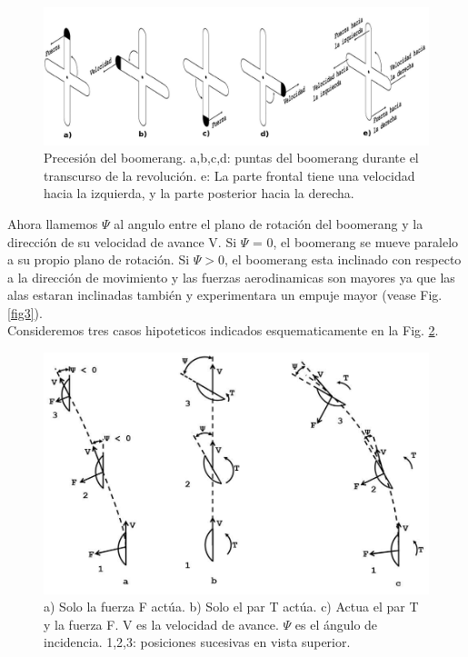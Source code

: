 		\begin{figure}[ht]
		\begin{center}
		\includegraphics[scale=0.15]{imagenes/3-boomerang/PrecesionDelBoomerang.png}
		\caption{Precesión del boomerang. a,b,c,d: puntas del boomerang durante el transcurso de la revolución. e: La parte frontal tiene una velocidad hacia la izquierda, y la parte posterior hacia la derecha.}
		\label{fig8}
		\end{center}
		\end{figure}

	Ahora llamemos $\Psi$ al angulo entre el plano de rotación del boomerang y la dirección de su velocidad de avance V. Si $\Psi$ = 0, el boomerang se mueve paralelo a su propio plano de rotación. Si $\Psi>0$, el boomerang esta inclinado con respecto a la dirección de movimiento y las fuerzas aerodinamicas son mayores ya que las alas estaran inclinadas también y experimentara un empuje mayor (vease Fig. \ref{fig3}).\\

	Consideremos tres casos hipoteticos indicados esquematicamente en la Fig. \ref{fig9}.

		\begin{figure}[ht]
		\begin{center}
		\includegraphics[scale=0.3]{imagenes/3-boomerang/TresCasos.png}
		\caption{a) Solo la fuerza F actúa. b) Solo el par T actúa. c) Actua el par T y la fuerza F. V es la velocidad de avance. $\Psi$ es el ángulo de incidencia. 1,2,3: posiciones sucesivas en vista superior.}
		\label{fig9}
		\end{center}
		\end{figure}

